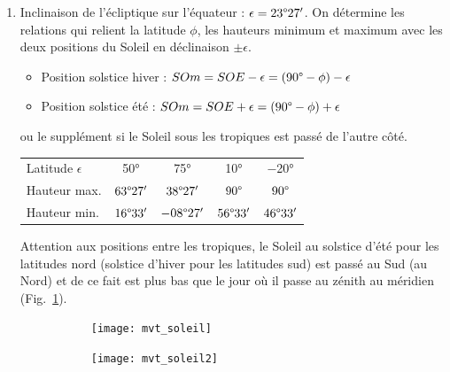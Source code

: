 \documentclass[a4paper,10pt]{report}
\renewcommand{\deg}{\ensuremath{\degree}}
\begin{document}
\begin{Answer}
  \begin{enumerate}
  \item Inclinaison de l'écliptique sur l'équateur :
    $\epsilon=23\deg27'$. On détermine les relations qui relient la
    latitude $\phi$, les hauteurs minimum et maximum avec les deux
    positions du Soleil en déclinaison $\pm \epsilon$.
    \begin{itemize}
    \item Position solstice hiver : $SOm = SOE - \epsilon =
      (90\deg-\phi) -\epsilon$
    \item Position solstice été : $SOm = SOE + \epsilon =
      (90\deg-\phi) +\epsilon$
    \end{itemize}
    ou le supplément si le Soleil sous les tropiques est passé de
    l'autre côté.
    \begin{center}
      \begin{tabular}{lcccc}
        \toprule
        Latitude $\epsilon$ & 50° & 75° & 10° & $-$20° \\
        Hauteur max. & $63\deg27'$ & $38\deg27'$ & $90\deg$ & $90\deg$ \\
        Hauteur min. & $16\deg33'$ & $-08\deg27'$ & $56\deg33'$ & $46\deg33'$ \\
        \bottomrule
      \end{tabular}
    \end{center}
    Attention aux positions entre les tropiques, le Soleil au solstice
    d'été pour les latitudes nord (solstice d'hiver pour les latitudes
    sud) est passé au Sud (au Nord) et de ce fait est plus bas que le
    jour où il passe au zénith au méridien (Fig.~\ref{fig:mvtsolaire}).

    \begin{figure}
      \centering
      \begin{subfigure}[b]{0.45\textwidth}
        \centering
        \texttt{[image: mvt\_soleil]}
        \caption{}
        \label{fig:mvtsolaire}
      \end{subfigure}
      \begin{subfigure}[b]{0.45\textwidth}
        \centering
        \texttt{[image: mvt\_soleil2]}
        \caption{}
        \label{fig:mvtsolaire2}
      \end{subfigure}
      \caption{}
    \end{figure}


\end{enumerate}
\end{Answer}
\end{document}
